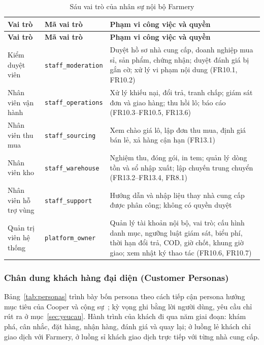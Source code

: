 \begingroup
\tblsetup\tblzebra
\begin{longtable}{L{3.30cm} L{3.60cm} L{8.00cm}}
\caption{Sáu vai trò của nhân sự nội bộ Farmery}
\label{tab:vaitro-noibo} \\
\toprule
{}
\textbf{Vai trò} & \textbf{Mã vai trò} & \textbf{Phạm vi công việc và quyền} \\
\midrule
\endfirsthead
\toprule
{}
\textbf{Vai trò} & \textbf{Mã vai trò} & \textbf{Phạm vi công việc và quyền} \\
\midrule
\endhead
\bottomrule
\endfoot
Kiểm duyệt viên & \texttt{staff\_moderation} & Duyệt hồ sơ nhà cung cấp, doanh nghiệp mua sỉ, sản phẩm, chứng nhận; duyệt đánh giá bị gắn cờ; xử lý vi phạm nội dung (FR10.1, FR10.2) \\
Nhân viên vận hành & \texttt{staff\_operations} & Xử lý khiếu nại, đổi trả, tranh chấp; giám sát đơn và giao hàng; thu hồi lô; báo cáo (FR10.3--FR10.5, FR13.6) \\
Nhân viên thu mua & \texttt{staff\_sourcing} & Xem chào giá lô, lập đơn thu mua, định giá bán lẻ, xả hàng cận hạn (FR13.1) \\
Nhân viên kho & \texttt{staff\_warehouse} & Nghiệm thu, đóng gói, in tem; quản lý dòng tồn và sổ nhập xuất; lập chuyến trung chuyển (FR13.2--FR13.4, FR8.1) \\
Nhân viên hỗ trợ vùng & \texttt{staff\_support} & Hướng dẫn và nhập liệu thay nhà cung cấp được phân công; không có quyền duyệt \\
Quản trị viên hệ thống & \texttt{platform\_owner} & Quản lý tài khoản nội bộ, vai trò; cấu hình danh mục, ngưỡng luật giám sát, biểu phí, thời hạn đổi trả, COD, giờ chốt, khung giờ giao; xem nhật ký thao tác (FR10.6, FR10.7) \\
\end{longtable}
\endgroup

\subsubsection{Chân dung khách hàng đại diện (Customer Personas)}
\label{subsec:customer-personas}

Bảng~\ref{tab:personas} trình bày bốn persona theo cách tiếp cận persona hướng mục tiêu của Cooper và cộng sự~\cite{cooper2014aboutface}; kỳ vọng ghi bằng lời người dùng, yêu cầu chỉ rút ra ở mục~\ref{sec:yeucau}. Hành trình của khách đi qua năm giai đoạn: khám phá, cân nhắc, đặt hàng, nhận hàng, đánh giá và quay lại; ở luồng lẻ khách chỉ giao dịch với Farmery, ở luồng sỉ khách giao dịch trực tiếp với từng nhà cung cấp.

